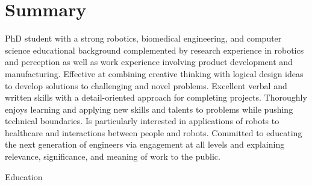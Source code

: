 \documentclass[10pt, letter]{article}
\begin{document}


\section*{Summary}
PhD student with a strong robotics, biomedical engineering, and computer science educational background complemented by research experience in robotics and perception as well as work experience involving product development and manufacturing. Effective at combining creative thinking with logical design ideas to develop solutions to challenging and novel problems. Excellent verbal and written skills with a detail-oriented approach for completing projects. Thoroughly enjoys learning and applying new skills and talents to problems while pushing technical boundaries. Is particularly interested in applications of robots to healthcare and interactions between people and robots. Committed to educating the next generation of engineers via engagement at all levels and explaining relevance, significance, and meaning of work to the public. 

\begin{cvsection}{Education}


\end{cvsection}
\end{document}
